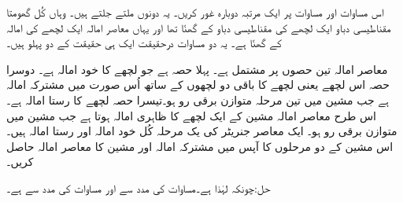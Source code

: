 اس مساوات اور مساوات   پر ایک مرتبہ دوبارہ غور کریں۔ یہ دونوں ملتے جلتے ہیں۔ وہاں کُل گھومتا مقناطیسی دباو ایک لچھے کی مقناطیسی دباو کے   گھنّا تھا اور یہاں معاصر امالہ ایک لچھے کی امالہ کے  گھنّا ہے۔ یہ دو مساوات درحقیقت ایک ہی حقیقت کے دو پہلو ہیں۔

معاصر امالہ تین حصوں پر مشتمل ہے۔ پہلا حصہ  ہے جو  لچھے کا خود امالہ ہے۔ دوسرا حصہ   اس لچھے یعنی  لچھے کا باقی دو لچھوں کے ساتھ اُس صورت میں مشترکہ امالہ ہے جب مشین میں تین مرحلہ متوازن برقی رو ہو۔تیسرا حصہ  لچھے   کا رستا امالہ ہے۔ اس طرح معاصر امالہ مشین کے ایک لچھے کا ظاہری امالہ ہوتا ہے جب مشین میں متوازن برقی رو ہو۔
%
ایک معاصر جنریٹر کی یک مرحلہ  کُل خود امالہ  اور رستا امالہ  ہیں۔اس مشین کے دو مرحلوں  کا آپس میں مشترکہ امالہ اور مشین کا معاصر امالہ حاصل کریں۔

حل:چونکہ   لہٰذا  ہے۔مساوات   کی مدد سے   اور مساوات   کی مدد سے   ہے۔
%

